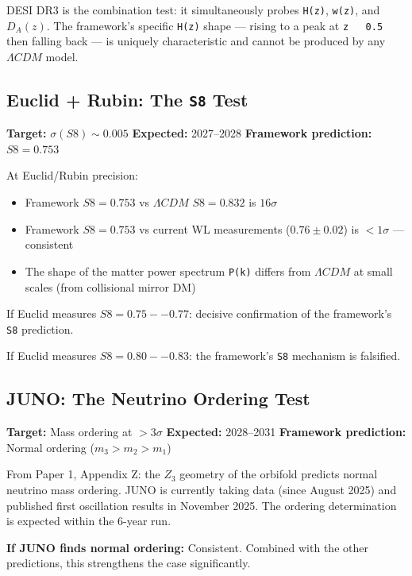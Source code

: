 \documentclass[aps,prd,preprint,superscriptaddress,longbibliography]{revtex4-2}
\begin{document}
DESI DR3 is the combination test: it simultaneously probes \texttt{H(z)}, \texttt{w(z)}, and $D_A(z)$. The framework's specific \texttt{H(z)} shape --- rising to a peak at \texttt{z ~ 0.5} then falling back --- is uniquely characteristic and cannot be produced by any $\Lambda CDM$ model.



\subsection{Euclid + Rubin: The \texttt{S8} Test}

\textbf{Target:} $\sigma(S8) \sim  0.005$ \textbf{Expected:} 2027--2028 \textbf{Framework prediction:} $S8 = 0.753$

At Euclid/Rubin precision:

\begin{itemize}
  \item Framework $S8 = 0.753$ vs $\Lambda CDM$ $S8 = 0.832$ is \textbf{$16\sigma$}
  \item Framework $S8 = 0.753$ vs current WL measurements ($0.76 \pm 0.02$) is $< 1\sigma$ --- consistent
  \item The shape of the matter power spectrum \texttt{P(k)} differs from $\Lambda CDM$ at small scales (from collisional mirror DM)
\end{itemize}

If Euclid measures $S8 = 0.75--0.77$: decisive confirmation of the framework's \texttt{S8} prediction.

If Euclid measures $S8 = 0.80--0.83$: the framework's \texttt{S8} mechanism is falsified.



\subsection{JUNO: The Neutrino Ordering Test}

\textbf{Target:} Mass ordering at $> 3\sigma$ \textbf{Expected:} 2028--2031 \textbf{Framework prediction:} Normal ordering ($m_{3} > m_{2} > m_{1}$)

From Paper 1, Appendix Z: the $Z_{3}$ geometry of the orbifold predicts normal neutrino mass ordering. JUNO is currently taking data (since August 2025) and published first oscillation results in November 2025. The ordering determination is expected within the 6-year run.

\textbf{If JUNO finds normal ordering:} Consistent. Combined with the other predictions, this strengthens the case significantly.
\end{document}
